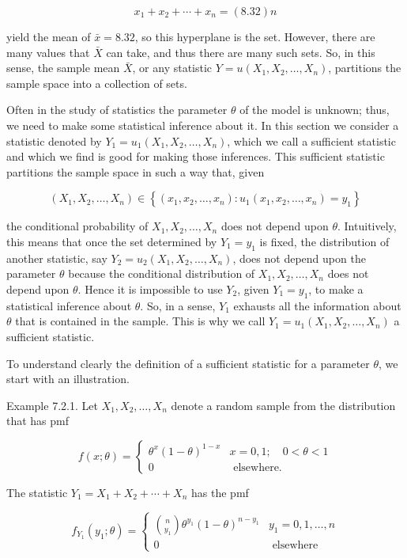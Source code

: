 $$
x_{1}+x_{2}+\cdots+x_{n}=(8.32) n
$$

yield the mean of $\bar{x}=8.32$, so this hyperplane is the set. However, there are many values that $\bar{X}$ can take, and thus there are many such sets. So, in this sense, the sample mean $\bar{X}$, or any statistic $Y=u\left(X_{1}, X_{2}, \ldots, X_{n}\right)$, partitions the sample space into a collection of sets.

Often in the study of statistics the parameter $\theta$ of the model is unknown; thus, we need to make some statistical inference about it. In this section we consider a statistic denoted by $Y_{1}=u_{1}\left(X_{1}, X_{2}, \ldots, X_{n}\right)$, which we call a sufficient statistic and which we find is good for making those inferences. This sufficient statistic partitions the sample space in such a way that, given

$$
\left(X_{1}, X_{2}, \ldots, X_{n}\right) \in\left\{\left(x_{1}, x_{2}, \ldots, x_{n}\right): u_{1}\left(x_{1}, x_{2}, \ldots, x_{n}\right)=y_{1}\right\}
$$

the conditional probability of $X_{1}, X_{2}, \ldots, X_{n}$ does not depend upon $\theta$. Intuitively, this means that once the set determined by $Y_{1}=y_{1}$ is fixed, the distribution of another statistic, say $Y_{2}=u_{2}\left(X_{1}, X_{2}, \ldots, X_{n}\right)$, does not depend upon the parameter $\theta$ because the conditional distribution of $X_{1}, X_{2}, \ldots, X_{n}$ does not depend upon $\theta$. Hence it is impossible to use $Y_{2}$, given $Y_{1}=y_{1}$, to make a statistical inference about $\theta$. So, in a sense, $Y_{1}$ exhausts all the information about $\theta$ that is contained in the sample. This is why we call $Y_{1}=u_{1}\left(X_{1}, X_{2}, \ldots, X_{n}\right)$ a sufficient statistic.

To understand clearly the definition of a sufficient statistic for a parameter $\theta$, we start with an illustration.

Example 7.2.1. Let $X_{1}, X_{2}, \ldots, X_{n}$ denote a random sample from the distribution that has pmf

$$
f(x ; \theta)= \begin{cases}\theta^{x}(1-\theta)^{1-x} & x=0,1 ; \quad 0<\theta<1 \\ 0 & \text { elsewhere. }\end{cases}
$$

The statistic $Y_{1}=X_{1}+X_{2}+\cdots+X_{n}$ has the pmf

$$
f_{Y_{1}}\left(y_{1} ; \theta\right)= \begin{cases}\binom{n}{y_{1}} \theta^{y_{1}}(1-\theta)^{n-y_{1}} & y_{1}=0,1, \ldots, n \\ 0 & \text { elsewhere }\end{cases}
$$


